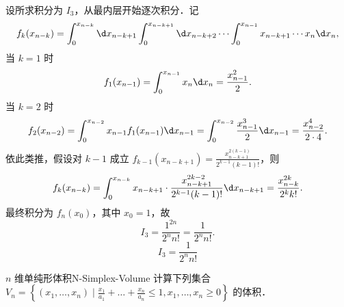 \begin{solution}

    设所求积分为 $I_3$，从最内层开始逐次积分．记
    \begin{equation}
        f_k(x_{n-k}) = \int_0^{x_{n-k}} \d x_{n-k+1} \int_0^{x_{n-k+1}} \d x_{n-k+2} \cdots \int_0^{x_{n-1}} x_{n-k+1} \cdots x_n \d x_n,
    \end{equation}
    当 $k=1$ 时
    \begin{equation}
        f_1(x_{n-1}) = \int_0^{x_{n-1}} x_n \d x_n = \frac{x_{n-1}^2}{2}.
    \end{equation}
    当 $k=2$ 时
    \begin{equation}
        f_2(x_{n-2}) = \int_0^{x_{n-2}} x_{n-1} f_1(x_{n-1}) \d x_{n-1} = \int_0^{x_{n-2}} \frac{x_{n-1}^3}{2} \d x_{n-1} = \frac{x_{n-2}^4}{2 \cdot 4}.
    \end{equation}
    依此类推，假设对 $k-1$ 成立 $f_{k-1}(x_{n-k+1}) = \frac{x_{n-k+1}^{2(k-1)}}{2^{k-1} (k-1)!}$，则
    \begin{equation}
        f_k(x_{n-k}) = \int_0^{x_{n-k}} x_{n-k+1} \cdot \frac{x_{n-k+1}^{2k-2}}{2^{k-1} (k-1)!} \d x_{n-k+1} = \frac{x_{n-k}^{2k}}{2^k k!}.
    \end{equation}
    最终积分为 $f_n(x_0)$，其中 $x_0 = 1$，故
    \begin{equation}
        I_3 = \frac{1^{2n}}{2^n n!} = \frac{1}{2^n n!}.
    \end{equation}
    \begin{equation}
        \boxed{I_3 = \frac{1}{2^n n!}}
    \end{equation}
\end{solution}

\begin{problem}{$n$ 维单纯形体积}{N-Simplex-Volume}
    计算下列集合 $V_n = \left\{ (x_1, \dots, x_n) \mid \frac{x_1}{a_1} + \dots + \frac{x_n}{a_n} \leqslant 1, x_1, \dots, x_n \geqslant 0 \right\}$ 的体积．
\end{problem}


